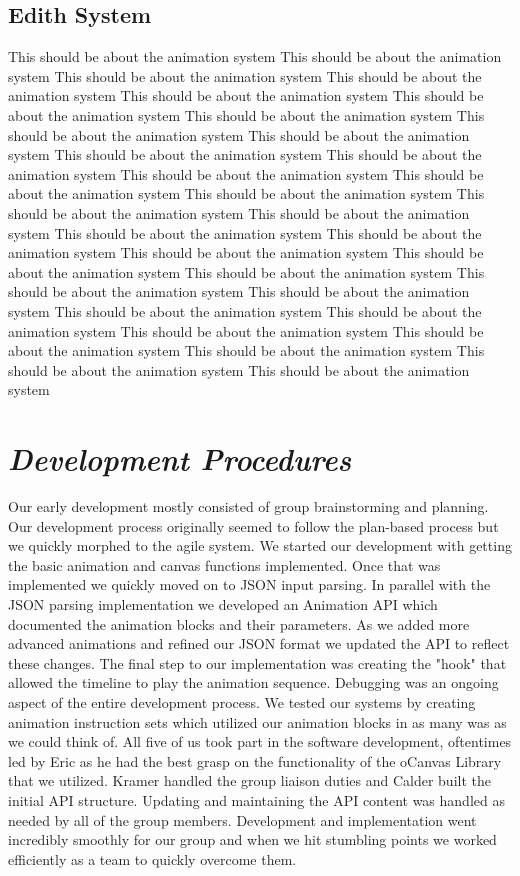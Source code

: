 \documentclass[12pt]{article}
\begin{document}
\subsection{Edith System}
\begin{changemargin}{1cm}{0cm} 
This should be about the animation system This should be about the animation system This should be about the animation system This should be about the animation system This should be about the animation system This should be about the animation system This should be about the animation system This should be about the animation system This should be about the animation system This should be about the animation system This should be about the animation system This should be about the animation system This should be about the animation system This should be about the animation system This should be about the animation system This should be about the animation system This should be about the animation system This should be about the animation system This should be about the animation system This should be about the animation system This should be about the animation system This should be about the animation system This should be about the animation system This should be about the animation system This should be about the animation system This should be about the animation system This should be about the animation system This should be about the animation system This should be about the animation system This should be about the animation system
\end{changemargin} 

\section{\emph{Development Procedures}}
Our early development mostly consisted of group brainstorming and planning.  Our development process originally seemed to follow the plan-based process but we quickly morphed to the agile system.
We started our development with getting the basic animation and canvas functions implemented.  Once that was implemented we quickly moved on to JSON input parsing.  In parallel with the JSON parsing implementation we developed an Animation API which documented the animation blocks and their parameters.  As we added more advanced animations and refined our JSON format we updated the API to reflect these changes.  The final step to our implementation was creating the "hook" that allowed the timeline to play the animation sequence.  Debugging was an ongoing aspect of the entire development process.
We tested our systems by creating animation instruction sets which utilized our animation blocks in as many was as we could think of.  
All five of us took part in the software development, oftentimes led by Eric as he had the best grasp on the functionality of the oCanvas Library that we utilized.  Kramer handled the group liaison duties and Calder built the initial API structure.  Updating and maintaining the API content was handled as needed by all of the group members.
Development and implementation went incredibly smoothly for our group and when we hit stumbling points we worked efficiently as a team to quickly overcome them.
\end{document}
